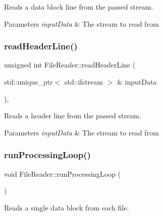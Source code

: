 Reads a data block line from the passed stream. 


\begin{DoxyParams}{Parameters}
{\em input\+Data} & The stream to read from \\
\hline
\end{DoxyParams}
\mbox{\label{class_file_reader_a94181d78b29ebacf2a4b3b3cd03a6750}} 
\subsubsection{\texorpdfstring{read\+Header\+Line()}{readHeaderLine()}}
{\footnotesize\ttfamily unsigned int File\+Reader\+::read\+Header\+Line (\begin{DoxyParamCaption}\item[{std\+::unique\+\_\+ptr$<$ std\+::ifstream $>$ \&}]{input\+Data }\end{DoxyParamCaption})\hspace{0.3cm}{\ttfamily [inline]}, {\ttfamily [private]}}



Reads a header line from the passed stream. 


\begin{DoxyParams}{Parameters}
{\em input\+Data} & The stream to read from \\
\hline
\end{DoxyParams}
\mbox{\label{class_file_reader_a98606ec7d315f1ed6f90c531df0d09f9}} 
\subsubsection{\texorpdfstring{run\+Processing\+Loop()}{runProcessingLoop()}}
{\footnotesize\ttfamily void File\+Reader\+::run\+Processing\+Loop (\begin{DoxyParamCaption}{ }\end{DoxyParamCaption})\hspace{0.3cm}{\ttfamily [private]}}



Reads a single data block from each file. 


